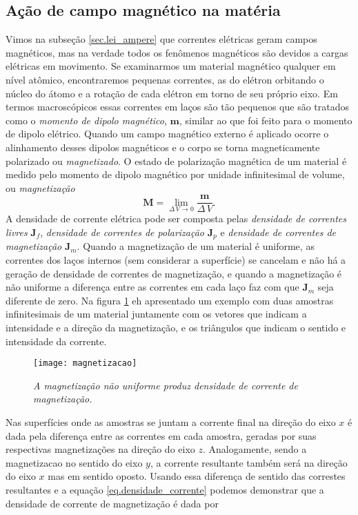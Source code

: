 \subsection{A\c{c}\~ao de campo magn\'etico na mat\'eria}

Vimos na subseç\~ao \ref{sec.lei_ampere} que correntes el\'etricas geram campos magn\'eticos, mas na verdade todos os fen\^omenos magn\'eticos são devidos a cargas el\'etricas em movimento. Se examinarmos um material magn\'etico qualquer em n\'ivel at\^omico, encontraremos pequenas correntes, as do el\'etron orbitando o n\'ucleo do \'atomo e a rota\c{c}\~ao de cada el\'etron em torno de seu pr\'oprio eixo. Em termos macrosc\'opicos essas correntes em la\c{c}os s\~ao t\~ao pequenos que s\~ao tratados como o \textit{momento de dipolo magn\'etico}, $\mathbf{m}$, similar ao que foi feito para o momento de dipolo el\'etrico. Quando um campo magn\'etico externo \'e aplicado ocorre o alinhamento desses dipolos magn\'eticos e o corpo se torna magneticamente polarizado ou \textit{magnetizado}. O estado de polariza\c{c}\~ao magn\'etica de um material \'e medido pelo momento de dipolo magn\'etico por unidade infinitesimal de volume, ou \textit{magnetiza\c{c}\~ao}
\begin{equation*}
\mathbf{M}=\lim_{\Delta\,V\to 0}\frac{\mathbf{m}}{\Delta\,V}.
\end{equation*}   
A densidade de corrente el\'etrica pode ser composta pelas \textit{densidade de correntes livres} $\mathbf{J}_f$, \textit{densidade de correntes de polariza\c{c}\~ao} $\mathbf{J}_p$ e \textit{densidade de correntes de magnetiza\c{c}\~ao} $\mathbf{J}_m$. Quando a magnetiza\c{c}\~ao de um material \'e uniforme, as correntes dos la\c{c}os internos (sem considerar a superf\'icie) se cancelam e n\~ao h\'a a gera\c{c}\~ao de densidade de correntes de magnetiza\c{c}\~ao, e quando a magnetiza\c{c}\~ao \'e n\~ao uniforme a diferen\c{c}a entre as correntes em cada la\c{c}o faz com que $\mathbf{J}_m$ seja diferente de zero. Na figura \ref{fig.magnetizacao} eh apresentado um exemplo com duas amostras infinitesimais de um material juntamente com os vetores que indicam a intensidade e a dire\c{c}\~ao da magnetiza\c{c}\~ao, e os tri\^angulos que indicam o sentido e intensidade da corrente.
\begin{figure}
\centering
\texttt{[image: magnetizacao]}
\caption{\textit{A magnetiza\c{c}\~ao n\~ao uniforme produz densidade de corrente de magnetiza\c{c}\~ao.}}
\label{fig.magnetizacao}
\end{figure}     
Nas superf\'icies onde as amostras se juntam a corrente final na dire\c{c}\~ao do eixo $x$ \'e dada pela diferen\c{c}a entre as correntes em cada amostra, geradas por suas respectivas magnetiza\c{c}\~oes na dire\c{c}\~ao do eixo $z$. Analogamente, sendo a magnetizacao no sentido do eixo $y$, a corrente resultante tamb\'em ser\'a na dire\c{c}\~ao do eixo $x$ mas em sentido oposto. Usando essa diferen\c{c}a de sentido das correstes resultantes e a equa\c{c}\~ao \ref{eq.densidade_corrente} podemos demonstrar que a densidade de corrente de magnetiza\c{c}\~ao \'e dada por
